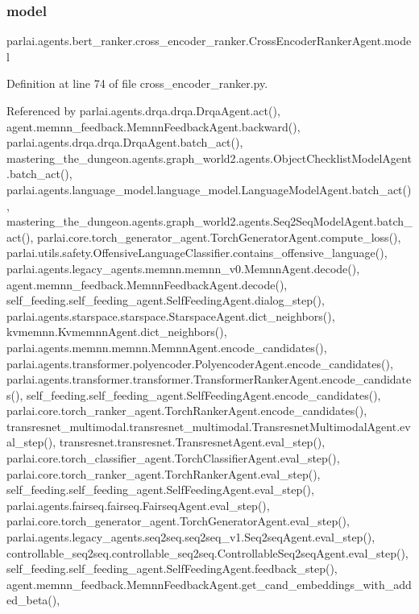 \subsubsection{\texorpdfstring{model}{model}}
{\footnotesize\ttfamily parlai.\+agents.\+bert\+\_\+ranker.\+cross\+\_\+encoder\+\_\+ranker.\+Cross\+Encoder\+Ranker\+Agent.\+model}



Definition at line 74 of file cross\+\_\+encoder\+\_\+ranker.\+py.



Referenced by parlai.\+agents.\+drqa.\+drqa.\+Drqa\+Agent.\+act(), agent.\+memnn\+\_\+feedback.\+Memnn\+Feedback\+Agent.\+backward(), parlai.\+agents.\+drqa.\+drqa.\+Drqa\+Agent.\+batch\+\_\+act(), mastering\+\_\+the\+\_\+dungeon.\+agents.\+graph\+\_\+world2.\+agents.\+Object\+Checklist\+Model\+Agent.\+batch\+\_\+act(), parlai.\+agents.\+language\+\_\+model.\+language\+\_\+model.\+Language\+Model\+Agent.\+batch\+\_\+act(), mastering\+\_\+the\+\_\+dungeon.\+agents.\+graph\+\_\+world2.\+agents.\+Seq2\+Seq\+Model\+Agent.\+batch\+\_\+act(), parlai.\+core.\+torch\+\_\+generator\+\_\+agent.\+Torch\+Generator\+Agent.\+compute\+\_\+loss(), parlai.\+utils.\+safety.\+Offensive\+Language\+Classifier.\+contains\+\_\+offensive\+\_\+language(), parlai.\+agents.\+legacy\+\_\+agents.\+memnn.\+memnn\+\_\+v0.\+Memnn\+Agent.\+decode(), agent.\+memnn\+\_\+feedback.\+Memnn\+Feedback\+Agent.\+decode(), self\+\_\+feeding.\+self\+\_\+feeding\+\_\+agent.\+Self\+Feeding\+Agent.\+dialog\+\_\+step(), parlai.\+agents.\+starspace.\+starspace.\+Starspace\+Agent.\+dict\+\_\+neighbors(), kvmemnn.\+Kvmemnn\+Agent.\+dict\+\_\+neighbors(), parlai.\+agents.\+memnn.\+memnn.\+Memnn\+Agent.\+encode\+\_\+candidates(), parlai.\+agents.\+transformer.\+polyencoder.\+Polyencoder\+Agent.\+encode\+\_\+candidates(), parlai.\+agents.\+transformer.\+transformer.\+Transformer\+Ranker\+Agent.\+encode\+\_\+candidates(), self\+\_\+feeding.\+self\+\_\+feeding\+\_\+agent.\+Self\+Feeding\+Agent.\+encode\+\_\+candidates(), parlai.\+core.\+torch\+\_\+ranker\+\_\+agent.\+Torch\+Ranker\+Agent.\+encode\+\_\+candidates(), transresnet\+\_\+multimodal.\+transresnet\+\_\+multimodal.\+Transresnet\+Multimodal\+Agent.\+eval\+\_\+step(), transresnet.\+transresnet.\+Transresnet\+Agent.\+eval\+\_\+step(), parlai.\+core.\+torch\+\_\+classifier\+\_\+agent.\+Torch\+Classifier\+Agent.\+eval\+\_\+step(), parlai.\+core.\+torch\+\_\+ranker\+\_\+agent.\+Torch\+Ranker\+Agent.\+eval\+\_\+step(), self\+\_\+feeding.\+self\+\_\+feeding\+\_\+agent.\+Self\+Feeding\+Agent.\+eval\+\_\+step(), parlai.\+agents.\+fairseq.\+fairseq.\+Fairseq\+Agent.\+eval\+\_\+step(), parlai.\+core.\+torch\+\_\+generator\+\_\+agent.\+Torch\+Generator\+Agent.\+eval\+\_\+step(), parlai.\+agents.\+legacy\+\_\+agents.\+seq2seq.\+seq2seq\+\_\+v1.\+Seq2seq\+Agent.\+eval\+\_\+step(), controllable\+\_\+seq2seq.\+controllable\+\_\+seq2seq.\+Controllable\+Seq2seq\+Agent.\+eval\+\_\+step(), self\+\_\+feeding.\+self\+\_\+feeding\+\_\+agent.\+Self\+Feeding\+Agent.\+feedback\+\_\+step(), agent.\+memnn\+\_\+feedback.\+Memnn\+Feedback\+Agent.\+get\+\_\+cand\+\_\+embeddings\+\_\+with\+\_\+added\+\_\+beta(), 